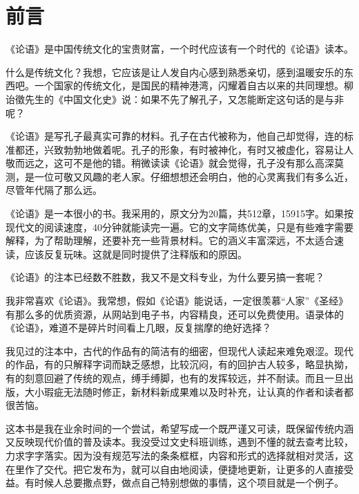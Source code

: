 \chapter*{前\qquad 言}

《论语》是中国传统文化的宝贵财富，一个时代应该有一个时代的《论语》读本。

什么是传统文化？我想，它应该是让人发自内心感到熟悉亲切，感到温暖安乐的东西吧。一个国家的传统文化，是国民的精神港湾，闪耀着自古以来的共同理想。柳诒徵先生的《中国文化史》说：如果不先了解孔子，又怎能断定这句话的是与非呢？

《论语》是写孔子最真实可靠的材料。孔子在古代被称为，他自己却觉得，连的标准都还，兴致勃勃地做着呢。孔子的形象，有时被神化，有时又被虚化，容易让人敬而远之，这可不是他的错。稍微读读《论语》就会觉得，孔子没有那么高深莫测，是一位可敬又风趣的老人家。仔细想想还会明白，他的心灵离我们有多么近，尽管年代隔了那么远。

《论语》是一本很小的书。我采用的，原文分为20篇，共512章，15915字。如果按现代文的阅读速度，40分钟就能读完一遍。它的文字简练优美，只是有些难字需要解释，为了帮助理解，还要补充一些背景材料。它的涵义丰富深远，不太适合速读，应该反复玩味。这就是同时提供了注释版和的原因。

《论语》的注本已经数不胜数，我又不是文科专业，为什么要另搞一套呢？

我非常喜欢《论语》。我常想，假如《论语》能说话，一定很羡慕“人家”《圣经》有那么多的优质资源，从网站到电子书，内容精良，还可以免费使用。语录体的《论语》，难道不是碎片时间看上几眼，反复揣摩的绝好选择？

我见过的注本中，古代的作品有的简洁有的细密，但现代人读起来难免艰涩。现代的作品，有的只解释字词而缺乏感想，比较沉闷，有的回护古人较多，略显执拗，有的刻意回避了传统的观点，缚手缚脚，也有的发挥较远，并不耐读。而且一旦出版，大小瑕疵无法随时修正，新材料新成果难以及时补充，让认真的作者和读者都很苦恼。

这本书是我在业余时间的一个尝试，希望写成一个既严谨又可读，既保留传统内涵又反映现代价值的普及读本。我没受过文史科班训练，遇到不懂的就去查考比较，力求字字落实。因为没有规范写法的条条框框，内容和形式的选择就相对灵活，这在里作了交代。把它发布为，就可以自由地阅读，便捷地更新，让更多的人直接受益。有时候人总要撒点野，做点自己特别想做的事情，这个项目就是一个例子。

